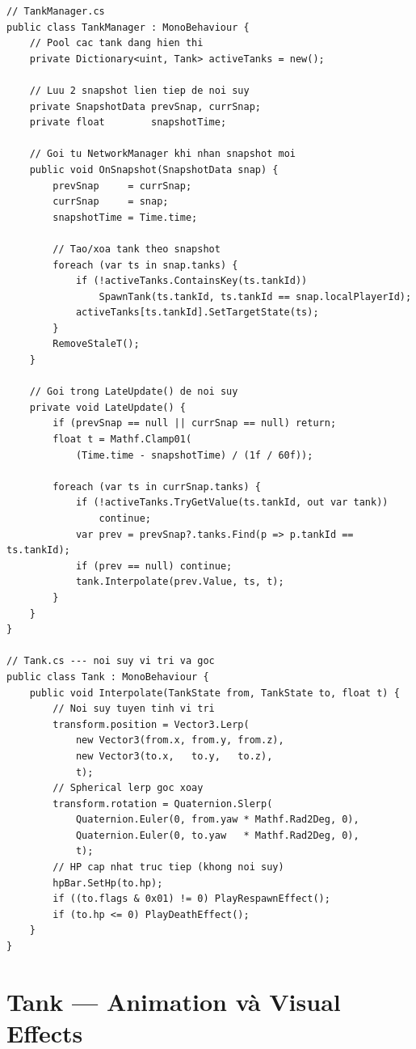 \documentclass[12pt,a4paper]{report}
\begin{document}
\begin{lstlisting}[style=bashStyle, caption={TankManager --- cập nhật tank từ snapshot}, label={lst:tankmanager}]
// TankManager.cs
public class TankManager : MonoBehaviour {
    // Pool cac tank dang hien thi
    private Dictionary<uint, Tank> activeTanks = new();

    // Luu 2 snapshot lien tiep de noi suy
    private SnapshotData prevSnap, currSnap;
    private float        snapshotTime;

    // Goi tu NetworkManager khi nhan snapshot moi
    public void OnSnapshot(SnapshotData snap) {
        prevSnap     = currSnap;
        currSnap     = snap;
        snapshotTime = Time.time;

        // Tao/xoa tank theo snapshot
        foreach (var ts in snap.tanks) {
            if (!activeTanks.ContainsKey(ts.tankId))
                SpawnTank(ts.tankId, ts.tankId == snap.localPlayerId);
            activeTanks[ts.tankId].SetTargetState(ts);
        }
        RemoveStaleT();
    }

    // Goi trong LateUpdate() de noi suy
    private void LateUpdate() {
        if (prevSnap == null || currSnap == null) return;
        float t = Mathf.Clamp01(
            (Time.time - snapshotTime) / (1f / 60f));

        foreach (var ts in currSnap.tanks) {
            if (!activeTanks.TryGetValue(ts.tankId, out var tank))
                continue;
            var prev = prevSnap?.tanks.Find(p => p.tankId == ts.tankId);
            if (prev == null) continue;
            tank.Interpolate(prev.Value, ts, t);
        }
    }
}

// Tank.cs --- noi suy vi tri va goc
public class Tank : MonoBehaviour {
    public void Interpolate(TankState from, TankState to, float t) {
        // Noi suy tuyen tinh vi tri
        transform.position = Vector3.Lerp(
            new Vector3(from.x, from.y, from.z),
            new Vector3(to.x,   to.y,   to.z),
            t);
        // Spherical lerp goc xoay
        transform.rotation = Quaternion.Slerp(
            Quaternion.Euler(0, from.yaw * Mathf.Rad2Deg, 0),
            Quaternion.Euler(0, to.yaw   * Mathf.Rad2Deg, 0),
            t);
        // HP cap nhat truc tiep (khong noi suy)
        hpBar.SetHp(to.hp);
        if ((to.flags & 0x01) != 0) PlayRespawnEffect();
        if (to.hp <= 0) PlayDeathEffect();
    }
}
\end{lstlisting}

\section{Tank --- Animation và Visual Effects}
\end{document}
